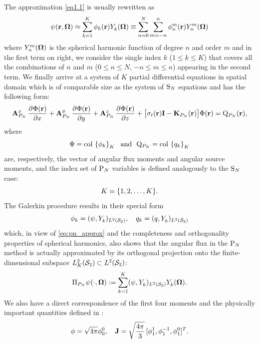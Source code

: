 The approximation \eqref{eq1.1} is usually rewritten as
\begin{equation}\label{eq:pn_approx}
	\psi(\br,\bomega) \approx \sum_{k=1}^{ K} \phi_k(\br)\Y{k}{}(\bomega) \equiv
	\suma[n]{0}{N}\suma[m]{-n}{n}\angmom{n}{m}(\br)\Y{n}{m}(\bomega)
\end{equation}
where $\Y{n}{m}(\bomega)$ is the spherical harmonic function of degree $n$ and order $m$
and in the first term on right, we consider the single index $k$ ($1 \leq k \leq  K$) that covers all the combinations of $n$ and $m$ ($0 \leq n \leq N$, $-n\leq m \leq n$) appearing in the second term. We finally arrive at a system of $ K$
partial differential equations in spatial domain which is of comparable size as the system of $\SN$ equations and has the following form:
\begin{equation}\label{eq:pn1}
	\mat{A}^x_{P_N}\,\pd{\Phi(\br)}{x} + \mat{A}^y_{P_N}\,\pd{\Phi(\br)}{y} + \mat{A}^z_{P_N}\,\pd{\Phi(\br)}{z} +
	\bigl[\sigma_t(\br)\mat{I} - \mathbf{K}_{P_N}(\br)\bigr]\Phi(\br) = \mathrm{Q}_{P_N}(\br),
\end{equation}
where 
\begin{equation}\label{eq:pn_vectors}
	\Phi = \col\left\{\phi_k\right\}_{\idxset{K}} \ \text{ and }\ 
	\mathrm{Q}_{P_N} = \col\left\{q_k\right\}_{\idxset{K}}
\end{equation}
are, respectively, the vector of angular flux
moments and angular source moments, and the index set of $\PN$ variables is defined analogously to the $\SN$ case:
$$
\idxset{K} = \{1,2,\ldots,K\}.
$$
The
Galerkin procedure results in their special form
\begin{equation}\label{eq:pn_angmom}
	\phi_k = (\psi, \Y{k}{})_{\Lp[2](\Sphere)},\quad q_k = (q, \Y{k}{})_{\Lp[2](\Sphere)}
\end{equation}
which, in view of \eqref{eq:pn_approx} and the completeness and orthogonality properties of spherical harmonics, also 
shows that the angular flux in the $\PN$ method is actually approximated by its orthogonal projection onto the
finite-dimensional subspace $\Lp[2]_K(\Sphere)\subset\Lp[2](\Sphere)$:
\begin{equation}\label{eq:PN_proj}
	\Projop\psi(\cdot,\bomega) := \sum_{k=1}^{ K}\ips{\psi}{\Y{k}{}} \Y{k}{}(\bomega).
\end{equation}
We also have a direct correspondence of the first four moments and the physically important quantities defined in
\sref{sec:qoi}:
$$
	\phi = \sqrt{4\pi}\angmom{0}{0},\quad \bJ = \sqrt{\frac{4\pi }{3}}\, [\angmom{1}{1}, \angmom{1}{-1}, \angmom{1}{0}]^T.
$$

